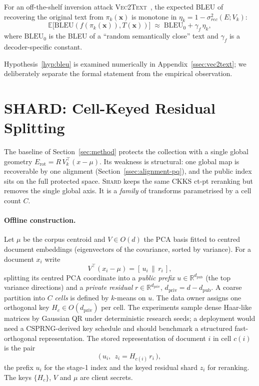 \begin{hypothesis}\label{hyp:bleu}
For an off-the-shelf inversion attack \textsc{Vec2Text}~\cite{ref_vec2text},
the expected BLEU of recovering the original text from
$\pi_k(\mathbf{x})$ is monotone in
$\eta_k = 1 - \sigma_{rec}^{2}(E; V_k)$:
\[
\mathbb{E}\bigl[ \mathrm{BLEU}(f(\pi_k(\mathbf{x})), T(\mathbf{x})) \bigr]
\;\approx\; \mathrm{BLEU}_0 + \gamma_f \, \eta_k,
\]
where $\mathrm{BLEU}_0$ is the BLEU of a ``random semantically close''
text and $\gamma_f$ is a decoder-specific constant.
\end{hypothesis}

Hypothesis~\ref{hyp:bleu} is examined numerically in
Appendix~\ref{ssec:vec2text}; we deliberately separate the formal
statement from the empirical observation.

\section{SHARD: Cell-Keyed Residual Splitting}\label{sec:shard}

The baseline of Section~\ref{sec:method} protects the collection with a
single global geometry $E_{\mathrm{rot}} = R\,V_k^\top(x-\mu)$. Its
weakness is structural: one global map is recoverable by one alignment
(Section~\ref{ssec:alignment-pq}), and the public index sits on the full
protected space. \textsc{Shard} keeps the same CKKS ct-pt reranking but
removes the single global axis. It is a \emph{family} of transforms
parametrised by a cell count $C$.

\paragraph{Offline construction.} Let $\mu$ be the corpus centroid and
$V\in O(d)$ the PCA basis fitted to centred document embeddings (eigenvectors
of the covariance, sorted by variance). For a document $x_i$ write
\[
V^\top(x_i-\mu)=[\,u_i\,\|\,r_i\,],
\]
splitting its centred PCA coordinate into a
\emph{public prefix} $u\in\mathbb{R}^{d_{\mathrm{pub}}}$ (the top variance
directions) and a \emph{private residual} $r\in\mathbb{R}^{d_{\mathrm{priv}}}$,
$d_{\mathrm{priv}}=d-d_{\mathrm{pub}}$. A coarse partition into $C$
\emph{cells} is defined by $k$-means on $u$. The data owner assigns one
orthogonal key $H_c\in O(d_{\mathrm{priv}})$ per cell. The experiments sample
dense Haar-like matrices by Gaussian QR under deterministic research seeds;
a deployment would need a CSPRNG-derived key schedule and should benchmark a
structured fast-orthogonal representation. The stored
representation of document $i$ in cell $c(i)$ is the pair
\[
\big(\, u_i,\ \ z_i = H_{c(i)}\, r_i \,\big),
\]
the prefix $u_i$ for the stage-1 index and the keyed residual shard $z_i$
for reranking. The keys $\{H_c\}$, $V$ and $\mu$ are client secrets.

